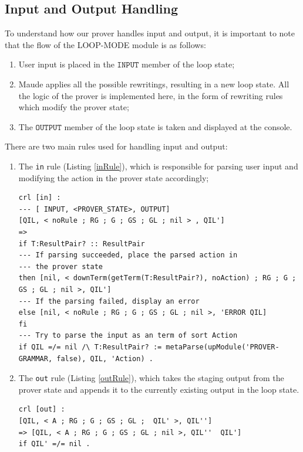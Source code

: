 \documentclass[12pt,a4paper]{article}
\begin{document}
\subsection{Input and Output Handling}
To understand how our prover handles input and output, it is important to note that the flow of the LOOP-MODE module is as follows: 
\begin{enumerate}
	\item User input is placed in the \(\mathtt{INPUT}\) member of the loop state;
	\item Maude applies all the possible rewritings, resulting in a new loop state. All the logic of the prover is implemented here, in the form of rewriting rules which modify the prover state;
	\item The \(\mathtt{OUTPUT}\) member of the loop state is taken and displayed at the console.
\end{enumerate}
There are two main rules used for handling input and output: 
\begin{enumerate}
	\item{The \texttt{in} rule (Listing \ref{inRule}), which is responsible for parsing user input and modifying the action in the prover state accordingly;}
	\begin{lstlisting}[caption=The \texttt{in} rule,label=inRule]
crl [in] : 
--- [ INPUT, <PROVER_STATE>, OUTPUT]
[QIL, < noRule ; RG ; G ; GS ; GL ; nil > , QIL']
=> 
if T:ResultPair? :: ResultPair  
--- If parsing succeeded, place the parsed action in
--- the prover state
then [nil, < downTerm(getTerm(T:ResultPair?), noAction) ; RG ; G ; GS ; GL ; nil >, QIL']  
--- If the parsing failed, display an error
else [nil, < noRule ; RG ; G ; GS ; GL ; nil >, 'ERROR QIL]  
fi  
--- Try to parse the input as an term of sort Action
if QIL =/= nil /\ T:ResultPair? := metaParse(upModule('PROVER-GRAMMAR, false), QIL, 'Action) .
\end{lstlisting}
	\item{The \texttt{out} rule (Listing \ref{outRule}), which takes the staging output from the prover state and appends it to the currently existing output in the loop state.}
	\begin{lstlisting}[caption=The \texttt{out} rule,label=outRule]
crl [out] :
[QIL, < A ; RG ; G ; GS ; GL ;  QIL' >, QIL'']
=> [QIL, < A ; RG ; G ; GS ; GL ; nil >, QIL''  QIL']
if QIL' =/= nil .
\end{lstlisting}
\end{enumerate}
\end{document}
